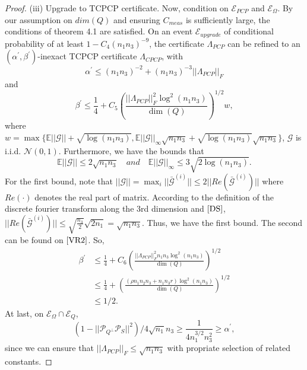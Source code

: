 \documentclass[journal,transmag]{IEEEtran}
\theoremstyle{plain}
\begin{document}
\begin{proof}
(iii) Upgrade to TCPCP certificate. Now, condition on $\mathcal{E}_{PCP}$ and $\mathcal{E}_{\Omega}$. By our assumption on $dim(Q)$ and ensuring $C_{meas}$ is sufficiently large, the conditions of theorem 4.1 are satisfied. On an event $\mathcal{E}_{upgrade}$ of conditional probability of at least $1-C_4 (n_1 n_3)^{-9}$, the certificate $\Lambda_{PCP}$ can be refined to an $(\alpha^{'},\beta^{'})$-inexact TCPCP certificate $\Lambda_{CPCP}$, with
\begin{equation}
\alpha^{'}\le (n_1 n_3)^{-2}+(n_1 n_3)^{-3} ||\Lambda_{PCP}||_F
\end{equation}
and
\begin{equation}
\beta^{'}\le \frac{1}{4}+C_5 (\frac{||\Lambda_{PCP}||^2_F \log^2(n_1 n_3)}{\dim(Q)})^{1/2}w ,
\end{equation}
where $w=\max\{ \mathbb{E}||\mathcal{G}||+\sqrt{\log(n_1 n_3)},
\mathbb{E}||\mathcal{G}||_{\infty}\sqrt{n_1 n_3}+\sqrt{\log(n_1 n_3)}\sqrt{n_1 n_3}\}$, $\mathcal{G}$ is i.i.d. $\mathcal{N}(0,1)$. Furthermore, we have the bounds that
\begin{equation}
\mathbb{E}||\mathcal{G}||\le 2\sqrt{n_1 n_3} \quad and \quad
\mathbb{E}||\mathcal{G}||_{\infty}\le 3\sqrt{2\log(n_1 n_3)}.
\end{equation}
For the first bound, note that $||\mathcal{G}||=\max_i ||\bar{\mathcal{G}}^{(i)}||\le 2||Re(\bar{\mathcal{G}}^{(i)})||$ where $Re(\cdot)$ denotes the real part of matrix. According to the definition of the discrete fourier transform along the 3rd dimension and $\cite{DS}$, $||Re(\bar{\mathcal{G}}^{(i)})|| \le \sqrt{\frac{n_3}{2}}\sqrt{2n_1}=\sqrt{n_1 n_3}$. Thus, we have the first bound. The second can be found on $\cite{VR2}$. So,
\begin{equation}
\begin{split}
\beta^{'} &\le \frac{1}{4}+C_6 (\frac{||\Lambda_{PCP}||^2_F n_1 n_3\log^2(n_1 n_3)}{\dim(Q)})^{1/2} \\
&\le \frac{1}{4}+ (\frac{ (\rho n_1 n_2 n_3+n_1 n_3 r) \log^2(n_1 n_3)}{\dim(Q)})^{1/2} \\
& \le 1/2.
\end{split}
\end{equation}
At last, on $\mathcal{E}_{\Omega}\cap\mathcal{E}_{Q}$,
\begin{equation}
(1-||\mathcal{P}_{Q^{\bot}}\mathcal{P}_S||^2)/4\sqrt{n_1}n_3\ge \frac{1}{4n_1^{3/2}n_3^2}\ge \alpha^{'},
\end{equation}
since we can ensure that $||\Lambda_{PCP}||_F \le \sqrt{n_1 n_3}$ with propriate selection of related constants.


\end{proof}
\end{document}
